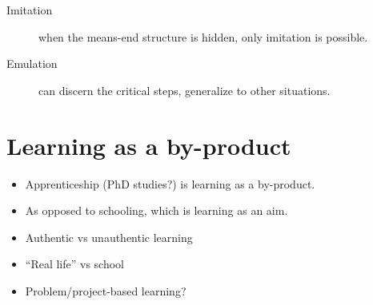 \begin{frame}
  \begin{definition}
    \begin{description}
      \item[Imitation] when the means-end structure is hidden, only imitation 
        is possible.
      \item[Emulation] can discern the critical steps, generalize to other 
        situations.
    \end{description}
  \end{definition}
\end{frame}

\section{Learning as a by-product}

\begin{frame}
  \begin{example}
    \begin{itemize}
      \item Apprenticeship (PhD studies?) is learning as a by-product.
      \item As opposed to schooling, which is learning as an aim.
    \end{itemize}
  \end{example}

  \pause

  \begin{example}
    \begin{itemize}
      \item Authentic vs unauthentic learning
      \item \enquote{Real life} vs school
      \item Problem/project-based learning?
    \end{itemize}
  \end{example}
\end{frame}

